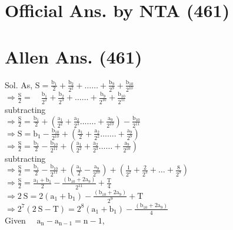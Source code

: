 \documentclass[10pt]{article}
\begin{document}
\section*{Official Ans. by NTA (461)}
\section*{Allen Ans. (461)}
Sol. As, \(\mathrm{S}=\frac{\mathrm{b}_{1}}{2}+\frac{\mathrm{b}_{2}}{2^{2}}+\ldots \ldots+\frac{\mathrm{b}_{9}}{2^{9}}+\frac{\mathrm{b}_{10}}{2^{10}}\)\\
\(\Rightarrow \frac{\mathrm{S}}{2}=\quad \frac{\mathrm{b}_{1}}{2^{2}}+\frac{\mathrm{b}_{2}}{2^{3}}+\ldots \ldots+\frac{\mathrm{b}_{9}}{2^{10}}+\frac{\mathrm{b}_{10}}{2^{11}}\)\\
subtracting\\
\(\Rightarrow \frac{\mathrm{S}}{2}=\frac{\mathrm{b}_{1}}{2}+\left(\frac{\mathrm{a}_{1}}{2^{2}}+\frac{\mathrm{a}_{2}}{2^{3}} \ldots \ldots .+\frac{\mathrm{a}_{9}}{2^{10}}\right)-\frac{\mathrm{b}_{10}}{2^{11}}\)\\
\(\Rightarrow \mathrm{S}=\mathrm{b}_{1}-\frac{\mathrm{b}_{10}}{2^{10}}+\left(\frac{\mathrm{a}_{1}}{2}+\frac{\mathrm{a}_{2}}{2^{2}} \ldots \ldots .+\frac{\mathrm{a}_{9}}{2^{9}}\right)\)\\
\(\Rightarrow \frac{\mathrm{S}}{2}=\frac{\mathrm{b}_{1}}{2}-\frac{\mathrm{b}_{10}}{2^{11}}+\left(\frac{\mathrm{a}_{1}}{2^{2}}+\frac{\mathrm{a}_{2}}{2^{3}} \ldots \ldots+\frac{\mathrm{a}_{9}}{2^{10}}\right)\)\\
subtracting\\
\(\Rightarrow \frac{\mathrm{S}}{2}=\frac{\mathrm{b}_{1}}{2}-\frac{\mathrm{b}_{10}}{2^{11}}+\left(\frac{\mathrm{a}_{1}}{2}-\frac{\mathrm{a}_{9}}{2^{10}}\right)+\left(\frac{1}{2^{2}}+\frac{2}{2^{3}}+\ldots+\frac{8}{2^{9}}\right)\)\\
\(\Rightarrow \frac{\mathrm{S}}{2}=\frac{\mathrm{a}_{1}+\mathrm{b}_{1}}{2}-\frac{\left(\mathrm{b}_{10}+2 \mathrm{a}_{9}\right)}{2^{11}}+\frac{\mathrm{T}}{4}\)\\
\(\Rightarrow 2 \mathrm{~S}=2\left(\mathrm{a}_{1}+\mathrm{b}_{1}\right)-\frac{\left(\mathrm{b}_{10}+2 \mathrm{a}_{9}\right)}{2^{9}}+\mathrm{T}\)\\
\(\Rightarrow 2^{7}(2 \mathrm{~S}-\mathrm{T})=2^{8}\left(\mathrm{a}_{1}+\mathrm{b}_{1}\right)-\frac{\left(\mathrm{b}_{10}+2 \mathrm{a}_{9}\right)}{4}\)\\
Given \(\quad \mathrm{a}_{\mathrm{n}}-\mathrm{a}_{\mathrm{n}-1}=\mathrm{n}-1\),
\end{document}
